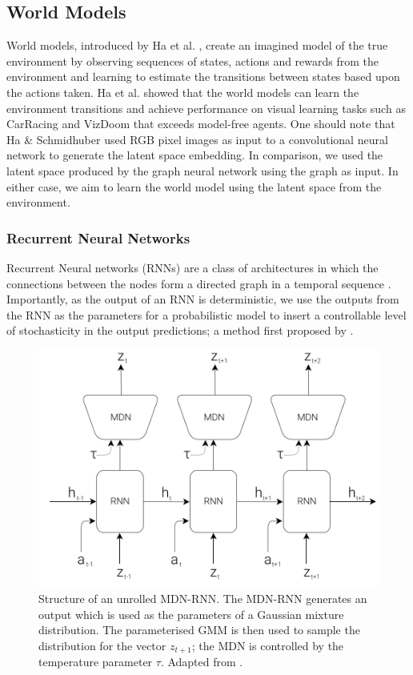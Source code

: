 \subsection{World Models}
World models, introduced by Ha et al. \cite{ha2018worldmodels}, create an imagined model of the true environment by observing sequences of states, actions and rewards from the environment and learning to estimate the transitions between states based upon the actions taken. Ha et al. showed that the world models can learn the environment transitions and achieve performance on visual learning tasks such as CarRacing and VizDoom that exceeds model-free agents. One should note that Ha \& Schmidhuber used RGB pixel images as input to a convolutional neural network to generate the latent space embedding. In comparison, we used the latent space produced by the graph neural network using the graph as input. In either case, we aim to learn the world model using the latent space from the environment.




\subsubsection{Recurrent Neural Networks}
\label{sec:rlopt:subsec:rnn}

Recurrent Neural networks (RNNs) are a class of architectures in which the connections between the nodes form a directed graph in a temporal sequence \cite{650093}. Importantly, as the output of an RNN is deterministic, we use the outputs from the RNN as the parameters for a probabilistic model to insert a controllable level of stochasticity in the output predictions; a method first proposed by \citet{graves2014generating}.

\begin{figure}[ht]
  \centering
  \includegraphics[width=0.75\columnwidth]{sections/4rlopt/images/mdnrnn.png}
  \caption[Temporally unrolled MDN-RNN]{Structure of an unrolled MDN-RNN. The MDN-RNN generates an output which is used as the parameters of a Gaussian mixture distribution. The parameterised GMM is then used to sample the distribution for the vector $z_{t+1}$; the MDN is controlled by the temperature parameter $\tau$. Adapted from \cite{ha2018worldmodels}.}
  \label{fig:rl:mdnrnn}
\end{figure}

